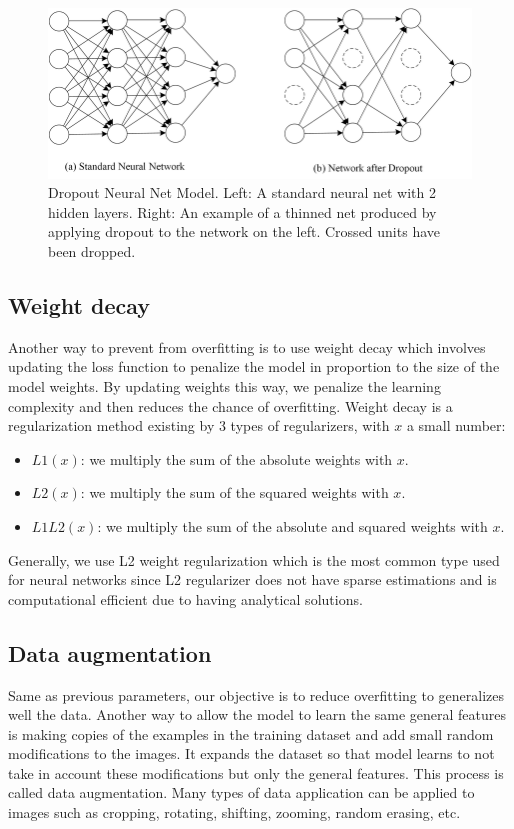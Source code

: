 \documentclass[11pt, openany]{report}
\theoremstyle{plain}
\theoremstyle{definition}
\theoremstyle{remark}
\begin{document}
\begin{figure}[h]
  \centering
  \includegraphics[scale=0.45]{figures/dropout.png}
  \caption{Dropout Neural Net Model. Left: A standard neural net with 2 hidden layers. Right: An example of a thinned net produced by applying dropout to the network on the left. Crossed units have been dropped. \cite{dropout}}
  \label{fig:dropout}
\end{figure}

\newpage
\subsection{Weight decay}
Another way to prevent from overfitting is to use weight decay which involves updating the loss function to penalize the model in proportion to the size of the model weights. By updating weights this way, we penalize the learning complexity and then reduces the chance of overfitting. Weight decay is a regularization method existing by 3 types of regularizers, with $x$ a small number:
\begin{itemize}
\item $L1(x)$: we multiply the sum of the absolute weights with $x$.
\item $L2(x)$: we multiply the sum of the squared weights with $x$.
\item $L1L2(x)$: we multiply the sum of the absolute and squared weights with $x$.
\end{itemize}  
Generally, we use L2 weight regularization which is the most common type used for neural networks since L2 regularizer does not have sparse estimations and is computational efficient due to having analytical solutions. 


\subsection{Data augmentation}
Same as previous parameters, our objective is to reduce overfitting to generalizes well the data. Another way to allow the model to learn the same general features is making copies of the examples in the training dataset and add small random modifications to the images. It expands the dataset so that model learns to not take in account these modifications but only the general features. This process is called data augmentation. Many types of data application can be applied to images such as cropping, rotating, shifting, zooming, random erasing, etc.   
\end{document}
